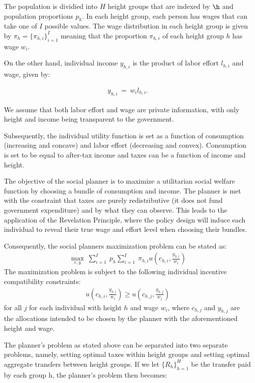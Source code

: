\documentclass[titlepage]{\econtex}
\begin{document}
The population is dividied into $H$ height groups that are indexed by $\h$ and population proportions $p_h$. In each height group, each person has wages that can take one of $I$ possible values. The wage distribution in each height group is given by $\pi_h = \{ \pi_{h,i}\}_{i=1}^I$ meaning that the proportion $\pi_{h,i}$ of each height group $h$ has wage $w_i$.

On the other hand, individual income $y_{h,i}$ is the product of labor effort $l_{h,i}$ and wage, given by:

\begin{align}
    y_{h,i} \ = \ w_i l_{h,i}. 
\end{align}

  We assume that both labor effort and wage are private information, with only height and income being transparent to the government.

  Subsequently, the individual utility function is set as a function of consumption (increasing and concave) and labor effort (decreasing and convex). Consumption is set to be equal to after-tax income and taxes can be a function of income and height.

  The objective of the social planner is to  maximize a utilitarian social welfare function by choosing a bundle of consumption and income. The planner is met with the constraint that taxes are purely redistributive (it does not fund government expenditure) and by what they can observe. This leads to the application of the Revelation Principle, where the policy design will induce each individual to reveal their true wage and effort level when choosing their bundles.

  Consequently, the social planners maximization problem can be stated as:
 \begin{align}
   \max_{c,y}~ \sum_{i=1}^I \ p_{h} \sum_{i=1}^I \ \pi_{h,i} u\left(c_{h,i}, \frac{y_{h,i}}{w_i}\right)
 \end{align}
 The maximization problem is subject to the following individual incentive compatibility constraints:
 \begin{align}
   u\left(c_{h,i}, \frac{y_{h,i}}{w_i}\right) \geq u\left(c_{h,j}, \frac{y_{h,j}}{w_j}\right)
 \end{align}
 for all $j$ for each individual with height $h$ and wage $w_i$, where $c_{h,j}$ and $y_{h,j}$ are the allocations intended to be chosen by the planner with the aforementioned height and wage.

 The planner's problem as stated above can be separated into two separate problems, namely, setting optimal taxes within height groups and setting optimal aggregate transfers between height groups. If we let $\{R_h\}_{h=1}^H$ be the transfer paid by each group h, the planner's problem then becomes:
\end{document}
